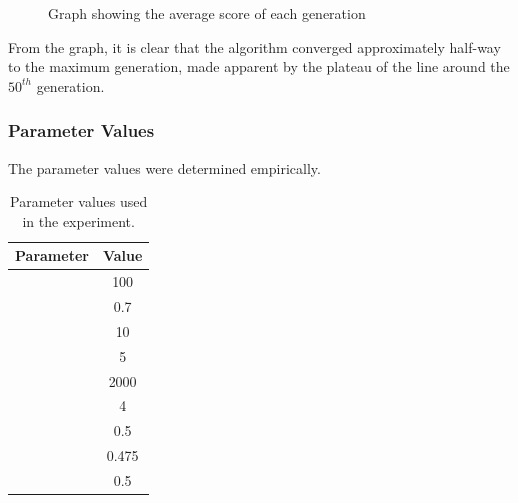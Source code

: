 \documentclass[a4paper,12pt]{article}
\begin{document}
{\begin{figure}[h!]
\begin{center}
                    \end{center}
                    \caption{Graph showing the average score of each generation}
                \end{figure} 
                \noindent From the graph, it is clear that the algorithm converged approximately half-way to the maximum generation, made apparent by the
                plateau of the line around the $50^{th}$ generation. 
            } 
        \subsubsection*{Parameter Values}
            \par{
                The parameter values were determined empirically.
                \begin{table}[h!]
                    \centering
                        \small 
                        \begin{tabular}{ | l | c | }

                            \hline
                            \textbf{Parameter} & \textbf{Value} \\
                            \hline  
                            \nameref{subsubsec:mg} & 100 \\ 
                            \nameref{subsubsec:kf} & 0.7 \\ 
                            \nameref{subsubsec:mmd} & 10 \\ 
                            \nameref{subsubsec:cmd} & 5 \\ 
                            \nameref{subsubsec:ps} & 2000 \\ 
                            \nameref{subsubsec:ts} & 4 \\ 
                            \nameref{subsubsec:car} & 0.5 \\ 
                            \nameref{subsubsec:mar} & 0.475 \\ 
                            \nameref{subsubsec:har} & 0.5 \\
                            \hline 
                        \end{tabular}
                        \caption{Parameter values used in the experiment.} 
                \end{table} 
            }
\end{document}
